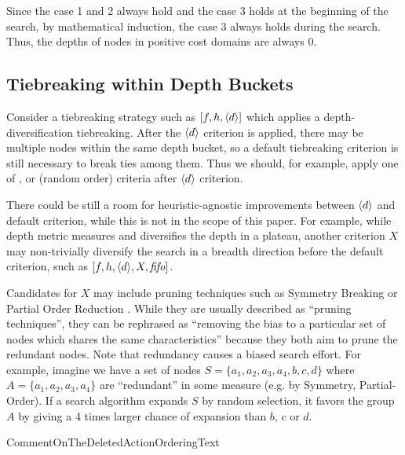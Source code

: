 Since the case 1 and 2 always hold and the case 3 holds at the beginning of the search,
by mathematical induction, the case 3 always holds during the search.
Thus, the depths of nodes in positive cost domains are always 0.

\subsection{Tiebreaking within Depth Buckets}

Consider a tiebreaking strategy such as $[f,h,{\left<d\right>}]$ which applies a depth-diversification tiebreaking.
After the ${\left<d\right>}$ criterion is applied, 
there may be multiple nodes within the same depth bucket, so a
default tiebreaking criterion is still necessary to break ties among them.
Thus we should, for example, apply one of \lifo, \fifo or \ro (random order) criteria
after ${\left<d\right>}$ criterion.

There could be still a room for heuristic-agnostic improvements between ${\left<d\right>}$ and default criterion,
 while this is not in the scope of this paper.  For example, while depth
metric measures and diversifies the depth in a plateau, another criterion $X$ may non-trivially diversify the
search in a breadth direction before the default criterion, such as $[f,h,{\left<d\right>},X,{\text{\textit{fifo}}}]$.

Candidates for $X$ may
include pruning techniques such as Symmetry Breaking \cite{Fox1998,pochter2011exploiting,domshlak2013symmetry} or
Partial Order Reduction \cite{hall2013faster,wehrle2013relative}.
While they are usually described as ``pruning techniques'',
they can be rephrased as ``removing the bias to a particular set
of nodes which shares the same characteristics'' because they both aim to
prune the redundant nodes. Note that redundancy causes a biased 
search effort. For example, imagine we have a
set of nodes $S=\{a_1, a_2, a_3, a_4, b, c, d\}$ where
$A=\{a_1, a_2, a_3, a_4\}$ are ``redundant'' in some measure (e.g. by Symmetry,
Partial-Order). 
If a search algorithm expands $S$ by random selection, it favors the
group $A$ by giving a 4 times larger chance of expansion than $b$,
$c$ or $d$.

CommentOnTheDeletedActionOrderingText

